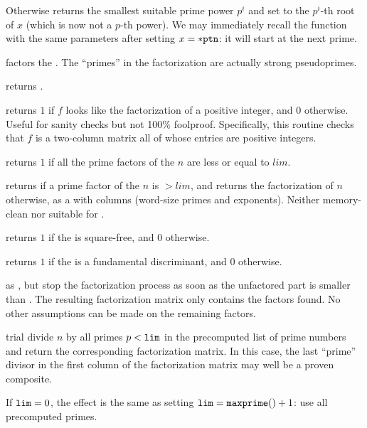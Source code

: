 Otherwise returns the smallest suitable prime power $p^i$ and set 
to the $p^i$-th root of $x$ (which is now not a $p$-th power). We may
immediately recall the function with the same parameters after setting $x =
{\tt *ptn}$: it will start at the next prime.


 factors the  . The ``primes''
in the factorization are actually strong pseudoprimes.

 returns .

 returns $1$ if $f$ looks like the factorization
of a positive integer, and $0$ otherwise. Useful for sanity checks but not
100\% foolproof. Specifically, this routine checks that $f$ is a two-column
matrix all of whose entries are positive integers.

 returns $1$ if all the
prime factors of the  $n$ are less or equal to $lim$.

 returns  if a prime
factor of the  $n$ is $> lim$, and returns the factorization
of $n$ otherwise, as a  with  columns (word-size
primes and exponents). Neither memory-clean nor suitable for
.

 returns $1$ if the  
is square-free, and $0$ otherwise.

 returns $1$ if the  
is a fundamental discriminant, and $0$ otherwise.

 as , but stop the
factorization process as soon as the unfactored part is smaller than .
The resulting factorization matrix only contains the factors found. No other
assumptions can be made on the remaining factors.

 trial divide $n$ by all primes $p
< {\tt lim}$ in the precomputed list of prime numbers and return the
corresponding factorization matrix. In this case, the last ``prime'' divisor
in the first column of the factorization matrix may well be a proven
composite.

If ${\tt lim} = 0$, the effect is the same as setting ${\tt lim} =
{\tt maxprime()} + 1$: use all precomputed primes.

